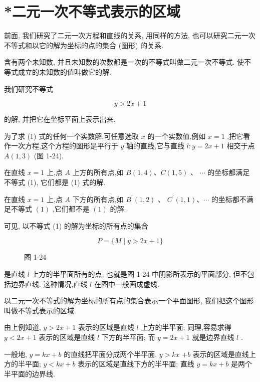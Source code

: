 \documentclass[lang=cn,newtx,10.5pt,scheme=chinese]{elegantbook}
\begin{document}
\section{*二元一次不等式表示的区域}

前面, 我们研究了二元一次方程和直线的关系, 用同样的方法, 也可以研究二元一次不等式和以它的解为坐标的点的集合 (图形) 的关系.

含有两个未知数, 并且未知数的次数都是一次的不等式叫做二元一次不等式. 使不等式成立的未知数的值叫做它的解.

我们研究不等式

\[
  y > {2x} + 1 \tag{1}
\]

的解, 并把它在坐标平面上表示出来.

为了求 (1) 式的任何一个实数解,可任意选取 \(x\) 的一个实数值,例如 \(x = 1\) ,把它看作一次方程,这个方程的图形是平行于 \(y\) 轴的直线,它与直线 \(l : y = {2x} + 1\) 相交于点 \(A\left( {1,3}\right)\) (图 1-24).

在直线 \(x = 1\) 上,点 \(A\) 上方的所有点,如 \(B\left( {1,4}\right) \text{、}C\left( {1,5}\right)\) 、 \(\cdots\) 的坐标都满足不等式 (1), 它们都是 (1) 式的解.

在直线 \(x = 1\) 上,点 \(A\) 下方的所有点,如 \({B}^{\prime }\left( {1,2}\right)\) 、 \({C}^{\prime }\left( {1,1}\right) \text{、}\cdots\) 的坐标都不满足不等式 \(\left( 1\right)\) ,它们都不是 \(\left( 1\right)\) 的解.

可见, 以不等式 (1) 的解为坐标的所有点的集合

\[
  P = \{ M \mid y > {2x} + 1\}
\]

\begin{figure}[h]
  \centering
  
  \caption{图 1-24}
\end{figure}

是直线 \(l\) 上方的半平面所有的点, 也就是图 1-24 中阴影所表示的平面部分, 但不包括边界直线. 这种情况,直线 \(l\) 在图中一般画成虚线.

以二元一次不等式的解为坐标的所有点的集合表示一个平面图形, 我们把这个图形叫做不等式表示的区域.

由上例知道, \(y > {2x} + 1\) 表示的区域是直线 \(l\) 上方的半平面; 同理,容易求得 \(y < {2x} + 1\) 表示的区域是直线 \(l\) 下方的半平面; 而 \(y = {2x} + 1\) 就是边界直线 \(l\) .

一般地, \(y = {kx} + b\) 的直线把平面分成两个半平面, \(y > {kx}\) \(+ b\) 表示的区域是直线上方的半平面; \(y < {kx} + b\) 表示的区域是直线下方的半平面; 直线 \(y = {kx} + b\) 是两个半平面的边界线.
\end{document}
